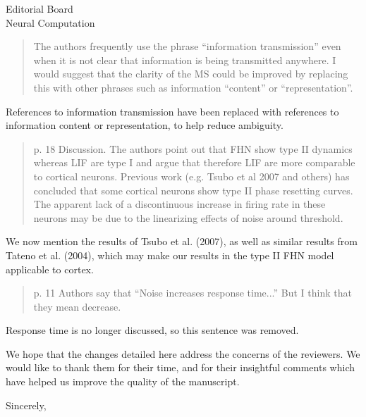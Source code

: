 \documentclass[]{letter}
\begin{document}
\begin{letter}{Editorial Board\\Neural Computation}
\begin{quotation}
  The authors frequently use the phrase ``information transmission'' even when it is not clear that information is being transmitted anywhere.  I would suggest that the clarity of the MS could be improved by replacing this with other phrases such as information ``content'' or ``representation''.
\end{quotation}

References to information transmission have been replaced with references to information content or representation, to help reduce ambiguity.

\begin{quotation}
  p. 18 Discussion.  The authors point out that FHN show type II dynamics whereas LIF are type I and argue that therefore LIF are more comparable to cortical neurons.  Previous work (e.g. Tsubo et al 2007 and others) has concluded that some cortical neurons show type II phase resetting curves.  The apparent lack of a discontinuous increase in firing rate in these neurons may be due to the linearizing effects of noise around threshold.
\end{quotation}

We now mention the results of Tsubo et al. (2007), as well as similar results from Tateno et al. (2004), which may make our results in the type II FHN model applicable to cortex.

\begin{quotation}
  p. 11 Authors say that ``Noise increases response time...'' But I think that they mean decrease.
\end{quotation}

Response time is no longer discussed, so this sentence was removed.

We hope that the changes detailed here address the concerns of the reviewers. We would like to thank them for their time, and for their insightful comments which have helped us improve the quality of the manuscript.

\closing{Sincerely,}

\end{letter}
\end{document}
